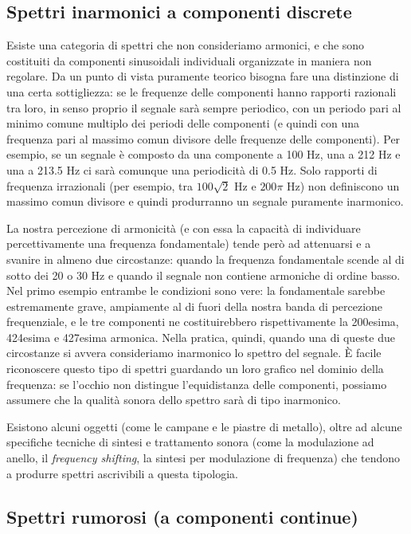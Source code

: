 \subsection{Spettri inarmonici a componenti discrete}

Esiste una categoria di spettri che non consideriamo armonici, e che sono costituiti da componenti sinusoidali individuali organizzate in maniera non regolare. Da un punto di vista puramente teorico bisogna fare una distinzione di una certa sottigliezza: se le frequenze delle componenti hanno rapporti razionali tra loro, in senso proprio il segnale sarà sempre periodico, con un periodo pari al minimo comune multiplo dei periodi delle componenti (e quindi con una frequenza pari al massimo comun divisore delle frequenze delle componenti). Per esempio, se un segnale è composto da una componente a 100 Hz, una a 212 Hz e una a 213.5 Hz ci sarà comunque una periodicità di 0.5 Hz. Solo rapporti di frequenza irrazionali (per esempio, tra $100 \sqrt{2}$ Hz e $200 \pi$ Hz) non definiscono un massimo comun divisore e quindi produrranno un segnale puramente inarmonico.

La nostra percezione di armonicità (e con essa la capacità di individuare percettivamente una frequenza fondamentale) tende però ad attenuarsi e a svanire in almeno due circostanze: quando la frequenza fondamentale scende al di sotto dei 20 o 30 Hz e quando il segnale non contiene armoniche di ordine basso. Nel primo esempio entrambe le condizioni sono vere: la fondamentale sarebbe estremamente grave, ampiamente al di fuori della nostra banda di percezione frequenziale, e le tre componenti ne costituirebbero rispettivamente la 200esima, 424esima e 427esima armonica. Nella pratica, quindi, quando una di queste due circostanze si avvera consideriamo inarmonico lo spettro del segnale. È facile riconoscere questo tipo di spettri guardando un loro grafico nel dominio della frequenza: se l'occhio non distingue l'equidistanza delle componenti, possiamo assumere che la qualità sonora dello spettro sarà di tipo inarmonico.

Esistono alcuni oggetti (come le campane e le piastre di metallo), oltre ad alcune specifiche tecniche di sintesi e trattamento sonora (come la modulazione ad anello, il \emph{frequency shifting}, la sintesi per modulazione di frequenza) che tendono a produrre spettri ascrivibili a questa tipologia.




\subsection{Spettri rumorosi (a componenti continue)}

